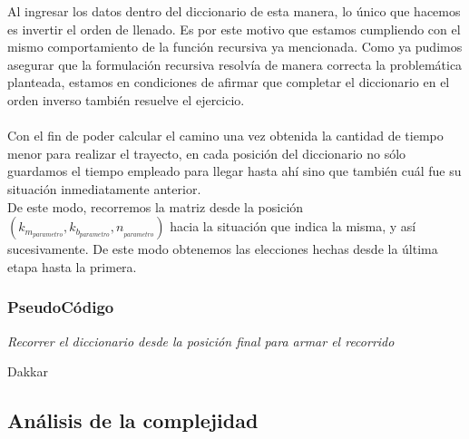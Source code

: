Al ingresar los datos dentro del diccionario de esta manera, lo \'unico que hacemos es invertir el orden de llenado. Es por este motivo que estamos cumpliendo con el mismo comportamiento de la funci\'on recursiva ya mencionada. Como ya pudimos asegurar que la formulaci\'on recursiva resolv\'ia de manera correcta la problem\'atica planteada, estamos en condiciones de afirmar que completar el diccionario en el orden inverso tambi\'en resuelve el ejercicio.\\
\\


Con el fin de poder calcular el camino una vez obtenida la cantidad de tiempo menor para realizar el trayecto, en cada posici\'on del diccionario no s\'olo guardamos el tiempo empleado para llegar hasta ah\'i sino que tambi\'en cu\'al fue su situaci\'on inmediatamente anterior.\\

De este modo, recorremos la matriz  desde la posici\'on $(k_{m_{parametro}},k_{b_{parametro}},n_{_{parametro}})$ hacia la situaci\'on que indica la misma, y as\'i sucesivamente. De este modo obtenemos las elecciones hechas desde la \'ultima etapa hasta la primera.

\newpage
\subsubsection*{PseudoC\'odigo}

\IncMargin{1em}
\begin{algorithm}
\BlankLine
\BlankLine
{}
\BlankLine
\emph{Recorrer el diccionario desde la posici\'on final para armar el recorrido}\;
\caption{Dakkar}%
\end{algorithm}\DecMargin{1em}

\newpage

\subsection{An\'alisis de la complejidad}

